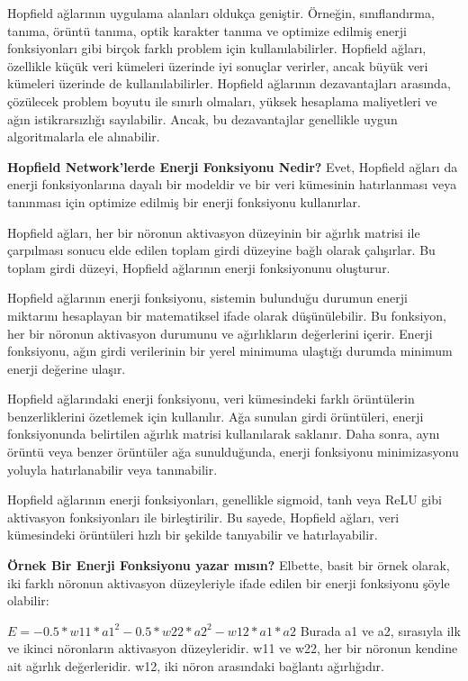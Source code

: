 \documentclass[11pt]{article}
\begin{document}
Hopfield ağlarının uygulama alanları oldukça geniştir. Örneğin, sınıflandırma, tanıma, örüntü tanıma, optik karakter tanıma ve optimize edilmiş enerji fonksiyonları gibi birçok farklı problem için kullanılabilirler. Hopfield ağları, özellikle küçük veri kümeleri üzerinde iyi sonuçlar verirler, ancak büyük veri kümeleri üzerinde de kullanılabilirler. Hopfield ağlarının dezavantajları arasında, çözülecek problem boyutu ile sınırlı olmaları, yüksek hesaplama maliyetleri ve ağın istikrarsızlığı sayılabilir. Ancak, bu dezavantajlar genellikle uygun algoritmalarla ele alınabilir.

\textbf{Hopfield Network'lerde Enerji Fonksiyonu Nedir?}
Evet, Hopfield ağları da enerji fonksiyonlarına dayalı bir modeldir ve bir veri kümesinin hatırlanması veya tanınması için optimize edilmiş bir enerji fonksiyonu kullanırlar.

Hopfield ağları, her bir nöronun aktivasyon düzeyinin bir ağırlık matrisi ile çarpılması sonucu elde edilen toplam girdi düzeyine bağlı olarak çalışırlar. Bu toplam girdi düzeyi, Hopfield ağlarının enerji fonksiyonunu oluşturur.

Hopfield ağlarının enerji fonksiyonu, sistemin bulunduğu durumun enerji miktarını hesaplayan bir matematiksel ifade olarak düşünülebilir. Bu fonksiyon, her bir nöronun aktivasyon durumunu ve ağırlıkların değerlerini içerir. Enerji fonksiyonu, ağın girdi verilerinin bir yerel minimuma ulaştığı durumda minimum enerji değerine ulaşır.

Hopfield ağlarındaki enerji fonksiyonu, veri kümesindeki farklı örüntülerin benzerliklerini özetlemek için kullanılır. Ağa sunulan girdi örüntüleri, enerji fonksiyonunda belirtilen ağırlık matrisi kullanılarak saklanır. Daha sonra, aynı örüntü veya benzer örüntüler ağa sunulduğunda, enerji fonksiyonu minimizasyonu yoluyla hatırlanabilir veya tanınabilir.

Hopfield ağlarının enerji fonksiyonları, genellikle sigmoid, tanh veya ReLU gibi aktivasyon fonksiyonları ile birleştirilir. Bu sayede, Hopfield ağları, veri kümesindeki örüntüleri hızlı bir şekilde tanıyabilir ve hatırlayabilir.

\textbf{Örnek Bir Enerji Fonksiyonu yazar mısın?}
Elbette, basit bir örnek olarak, iki farklı nöronun aktivasyon düzeyleriyle ifade edilen bir enerji fonksiyonu şöyle olabilir:

$ E = -0.5 * w11 * a1^2 - 0.5 * w22 * a2^2 - w12 * a1 * a2
$
Burada a1 ve a2, sırasıyla ilk ve ikinci nöronların aktivasyon düzeyleridir. w11 ve w22, her bir nöronun kendine ait ağırlık değerleridir. w12, iki nöron arasındaki bağlantı ağırlığıdır.
\end{document}
